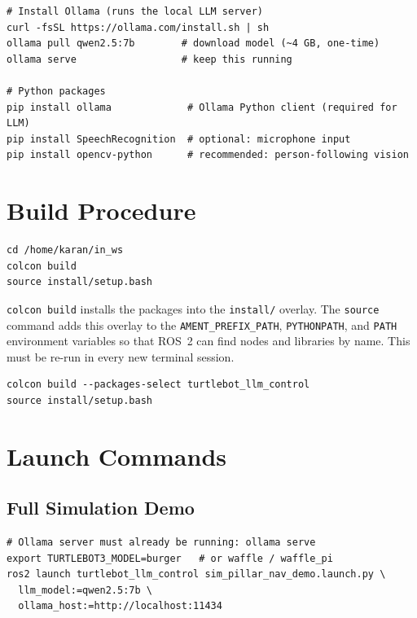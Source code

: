 \documentclass[12pt,a4paper]{report}
\begin{document}
\begin{lstlisting}[style=bashstyle, caption={Installing Ollama and required Python packages}]
# Install Ollama (runs the local LLM server)
curl -fsSL https://ollama.com/install.sh | sh
ollama pull qwen2.5:7b        # download model (~4 GB, one-time)
ollama serve                  # keep this running

# Python packages
pip install ollama             # Ollama Python client (required for LLM)
pip install SpeechRecognition  # optional: microphone input
pip install opencv-python      # recommended: person-following vision
\end{lstlisting}

\section{Build Procedure}

\begin{lstlisting}[style=bashstyle, caption={Standard build procedure from workspace root}]
cd /home/karan/in_ws
colcon build
source install/setup.bash
\end{lstlisting}

\begin{tcolorbox}[notebox, title=Why source install/setup.bash?]
  \texttt{colcon build} installs the packages into the \texttt{install/}
  overlay.  The \texttt{source} command adds this overlay to the
  \texttt{AMENT\_PREFIX\_PATH}, \texttt{PYTHONPATH}, and
  \texttt{PATH} environment variables so that ROS~2 can find nodes and
  libraries by name.  This must be re-run in every new terminal session.
\end{tcolorbox}

\begin{lstlisting}[style=bashstyle, caption={Rebuild only specific packages (faster iteration)}]
colcon build --packages-select turtlebot_llm_control
source install/setup.bash
\end{lstlisting}

\section{Launch Commands}

\subsection{Full Simulation Demo}

\begin{lstlisting}[style=bashstyle, caption={Start the full Gazebo + Nav2 + Ollama simulation stack}]
# Ollama server must already be running: ollama serve
export TURTLEBOT3_MODEL=burger   # or waffle / waffle_pi
ros2 launch turtlebot_llm_control sim_pillar_nav_demo.launch.py \
  llm_model:=qwen2.5:7b \
  ollama_host:=http://localhost:11434
\end{lstlisting}
\end{document}
